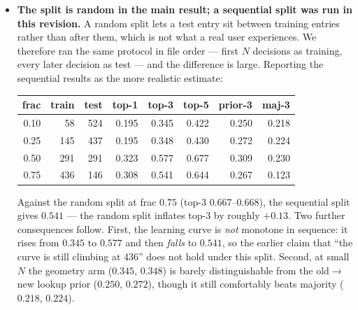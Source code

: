 \documentclass[11pt]{article}
\begin{document}
\begin{itemize}
\item \textbf{The split is random in the main result; a sequential split was
  run in this revision.} A random split lets a test entry sit between
  training entries rather than after them, which is not what a real user
  experiences. We therefore ran the same protocol in file order --- first
  $N$ decisions as training, every later decision as test --- and the
  difference is large. Reporting the sequential results as the more
  realistic estimate:

  \begin{center}
  \begin{tabular}{rrrrrrrr}
  \toprule
  \textbf{frac} & \textbf{train} & \textbf{test} & \textbf{top-1} & \textbf{top-3} & \textbf{top-5} & \textbf{prior-3} & \textbf{maj-3} \\
  \midrule
  0.10 & 58  & 524 & 0.195 & 0.345 & 0.422 & 0.250 & 0.218 \\
  0.25 & 145 & 437 & 0.195 & 0.348 & 0.430 & 0.272 & 0.224 \\
  0.50 & 291 & 291 & 0.323 & 0.577 & 0.677 & 0.309 & 0.230 \\
  0.75 & 436 & 146 & 0.308 & 0.541 & 0.644 & 0.267 & 0.123 \\
  \bottomrule
  \end{tabular}
  \end{center}

  Against the random split at frac $0.75$ (top-3 $0.667$--$0.668$), the
  sequential split gives $0.541$ --- the random split inflates top-3 by
  roughly $+0.13$. Two further consequences follow. First, the learning
  curve is \emph{not} monotone in sequence: it rises from $0.345$ to
  $0.577$ and then \emph{falls} to $0.541$, so the earlier claim that
  ``the curve is still climbing at 436'' does not hold under this split.
  Second, at small $N$ the geometry arm ($0.345$, $0.348$) is barely
  distinguishable from the old$\rightarrow$new lookup prior ($0.250$,
  $0.272$), though it still comfortably beats majority ($0.218$, $0.224$).


\end{itemize}
\end{document}
